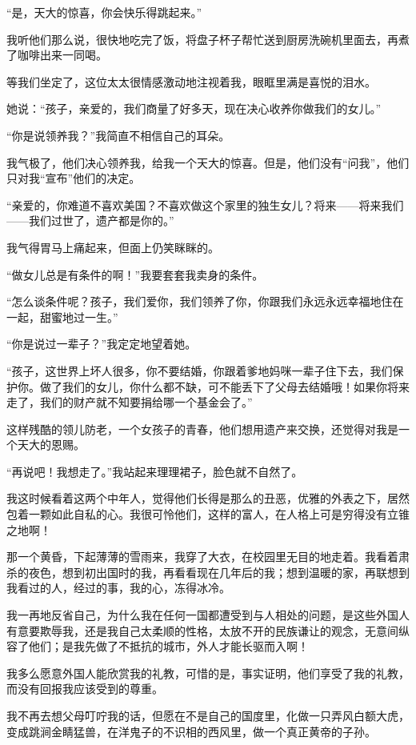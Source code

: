 \par “是，天大的惊喜，你会快乐得跳起来。”
\par 我听他们那么说，很快地吃完了饭，将盘子杯子帮忙送到厨房洗碗机里面去，再煮了咖啡出来一同喝。
\par 等我们坐定了，这位太太很情感激动地注视着我，眼眶里满是喜悦的泪水。
\par 她说：“孩子，亲爱的，我们商量了好多天，现在决心收养你做我们的女儿。”
\par “你是说领养我？”我简直不相信自己的耳朵。
\par 我气极了，他们决心领养我，给我一个天大的惊喜。但是，他们没有“问我”，他们只对我“宣布”他们的决定。
\par “亲爱的，你难道不喜欢美国？不喜欢做这个家里的独生女儿？将来——将来我们——我们过世了，遗产都是你的。”
\par 我气得胃马上痛起来，但面上仍笑眯眯的。
\par “做女儿总是有条件的啊！”我要套套我卖身的条件。
\par “怎么谈条件呢？孩子，我们爱你，我们领养了你，你跟我们永远永远幸福地住在一起，甜蜜地过一生。”
\par “你是说过一辈子？”我定定地望着她。
\par “孩子，这世界上坏人很多，你不要结婚，你跟着爹地妈咪一辈子住下去，我们保护你。做了我们的女儿，你什么都不缺，可不能丢下了父母去结婚哦！如果你将来走了，我们的财产就不知要捐给哪一个基金会了。”
\par 这样残酷的领儿防老，一个女孩子的青春，他们想用遗产来交换，还觉得对我是一个天大的恩赐。
\par “再说吧！我想走了。”我站起来理理裙子，脸色就不自然了。
\par 我这时候看着这两个中年人，觉得他们长得是那么的丑恶，优雅的外表之下，居然包着一颗如此自私的心。我很可怜他们，这样的富人，在人格上可是穷得没有立锥之地啊！
\par 那一个黄昏，下起薄薄的雪雨来，我穿了大衣，在校园里无目的地走着。我看着肃杀的夜色，想到初出国时的我，再看看现在几年后的我；想到温暖的家，再联想到我看过的人，经过的事，我的心，冻得冰冷。
\par 我一再地反省自己，为什么我在任何一国都遭受到与人相处的问题，是这些外国人有意要欺辱我，还是我自己太柔顺的性格，太放不开的民族谦让的观念，无意间纵容了他们；是我先做了不抵抗的城市，外人才能长驱而入啊！
\par 我多么愿意外国人能欣赏我的礼教，可惜的是，事实证明，他们享受了我的礼教，而没有回报我应该受到的尊重。
\par 我不再去想父母叮咛我的话，但愿在不是自己的国度里，化做一只弄风白额大虎，变成跳涧金睛猛兽，在洋鬼子的不识相的西风里，做一个真正黄帝的子孙。


